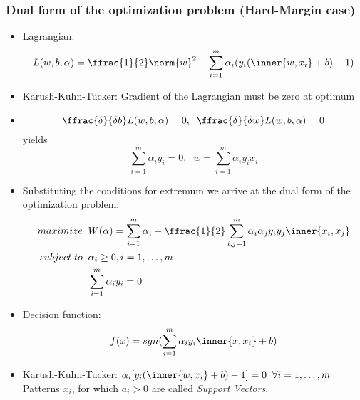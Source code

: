 \subsubsection*{Dual form of the optimization problem (Hard-Margin case)}
\begin{itemize}
    \item
        Lagrangian:
        $$L(w,b,\alpha) = \ffrac{1}{2}\norm{w}^2-\sum_{i=1}^{m}\alpha_i(y_i(\inner{w,x_i}+b)-1)$$
    \item
        Karush-Kuhn-Tucker: Gradient of the Lagrangian must be zero at optimum
    \item
        $$\ffrac{\delta}{\delta b}L(w,b,\alpha) = 0, \;\; \ffrac{\delta}{\delta w}L(w,b,\alpha) = 0$$
        yields
        $$\sum_{i=1}^{m}\alpha_i y_i = 0, \;\; w = \sum_{i=1}^{m}\alpha_i y_i x_i$$
    \item
        Substituting the conditions for extremum we arrive at the dual form of the optimization problem:
        \begin{align*}
            maximize \; \; & W(\alpha) = \sum_{i=1}^{m}\alpha_i - \ffrac{1}{2}\sum_{i,j=1}^{m}\alpha_i \alpha_j y_i y_j \inner{x_i,x_j}\\
            subject \; to \; \; & \alpha_i \geq 0, i=1,\dots,m \\%
            & \sum_{i=1}^{m} \alpha_i y_i = 0
        \end{align*}
    \item
        Decision function:
        $$f(x) = sgn(\sum_{i=1}^{m}\alpha_i y_i \inner{x,x_i}+b)$$
    \item
        Karush-Kuhn-Tucker: $\alpha_i[y_i(\inner{w,x_i}+b)-1]=0 \;\;\forall i=1,\dots ,m$\\
        Patterns $x_i$, for which $a_i > 0$ are called \textit{Support Vectors}.
\end{itemize}

